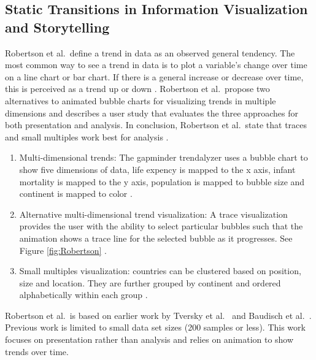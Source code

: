 \documentclass{egpubl}
\begin{document}
\subsection{Static Transitions in Information Visualization and Storytelling}
Robertson et al.\ define a trend in data as an observed general tendency. The most common way to see a trend in data is to plot a variable's change over time on a line chart or bar chart. If there is a general increase or decrease over time, this is perceived as a trend up or down \cite{Rebortson}.
Robertson et al.\ propose two alternatives to animated bubble charts for visualizing trends in multiple dimensions and describes a user study that evaluates the three approaches for both presentation and analysis. In conclusion, Robertson et al.\ state that traces and small multiples work best for analysis \cite{Rebortson}.
\begin{enumerate}
\item Multi-dimensional trends: The gapminder trendalyzer uses a bubble chart to show five dimensions of data, life expency is mapped to the x axis, infant mortality is mapped to the y axis, population is mapped to bubble size and continent is mapped to color \cite{ted1}.
\item Alternative multi-dimensional trend visualization: A trace visualization provides the user with the ability to select particular bubbles such that the animation shows a trace line for the selected bubble as it progresses. See Figure \ref{fig:Robertson} \cite{ted2}.
\item Small multiples visualization: countries can be clustered based on position, size and location. They are further grouped by continent and ordered alphabetically within each group \cite{Tufte}.
\end{enumerate}
Robertson et al.\ is based on earlier work by Tversky et al.\ \cite{tversky} and Baudisch et al.\ \cite{baudisch}. Previous work is limited to small data set sizes (200 samples or less). This work focuses on presentation rather than analysis and relies on animation to show trends over time.
\end{document}
